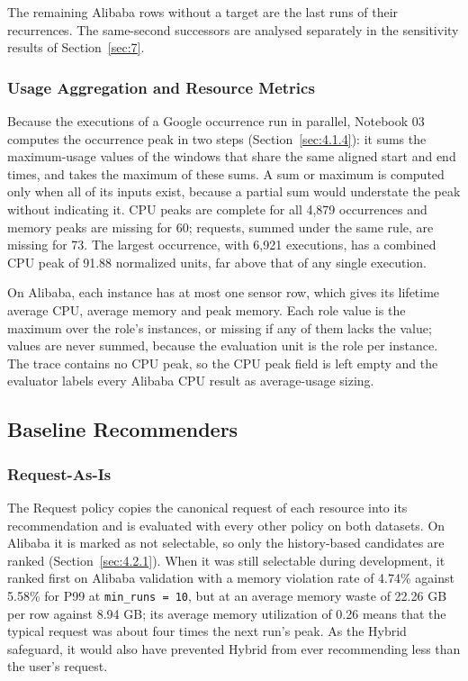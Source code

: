 The remaining Alibaba rows without a target are the last runs of their recurrences. The same-second successors are analysed separately in the sensitivity results of Section~\ref{sec:7}.

\subsubsection{Usage Aggregation and Resource Metrics}\label{sec:5.1.3}

Because the executions of a Google occurrence run in parallel, Notebook 03 computes the occurrence peak in two steps (Section~\ref{sec:4.1.4}): it sums the maximum-usage values of the windows that share the same aligned start and end times, and takes the maximum of these sums. A sum or maximum is computed only when all of its inputs exist, because a partial sum would understate the peak without indicating it. CPU peaks are complete for all 4,879 occurrences and memory peaks are missing for 60; requests, summed under the same rule, are missing for 73. The largest occurrence, with 6,921 executions, has a combined CPU peak of 91.88 normalized units, far above that of any single execution.

On Alibaba, each instance has at most one sensor row, which gives its lifetime average CPU, average memory and peak memory. Each role value is the maximum over the role's instances, or missing if any of them lacks the value; values are never summed, because the evaluation unit is the role per instance. The trace contains no CPU peak, so the CPU peak field is left empty and the evaluator labels every Alibaba CPU result as average-usage sizing.

\subsection{Baseline Recommenders}\label{sec:5.2}

\subsubsection{Request-As-Is}\label{sec:5.2.1}

The Request policy copies the canonical request of each resource into its recommendation and is evaluated with every other policy on both datasets. On Alibaba it is marked as not selectable, so only the history-based candidates are ranked (Section~\ref{sec:4.2.1}). When it was still selectable during development, it ranked first on Alibaba validation with a memory violation rate of 4.74\% against 5.58\% for P99 at \texttt{min\_runs\ =\ 10}, but at an average memory waste of 22.26 GB per row against 8.94 GB; its average memory utilization of 0.26 means that the typical request was about four times the next run's peak. As the Hybrid safeguard, it would also have prevented Hybrid from ever recommending less than the user's request.

